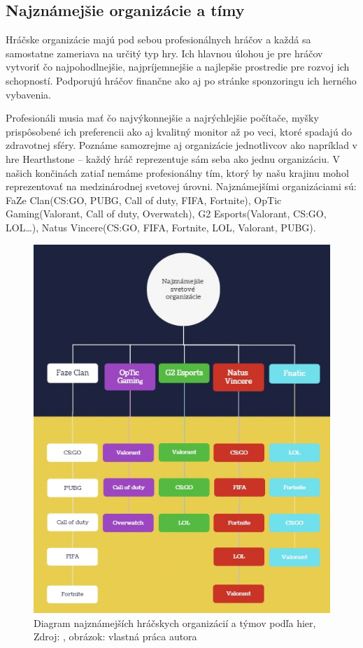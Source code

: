 \documentclass[10pt,oneside,slovak,a4paper]{article}
\begin{document}
\subsection{Najznámejšie organizácie a tímy} \label{klasifikacia:organizacie}

Hráčske organizácie majú pod sebou profesionálnych hráčov a každá sa samostatne zameriava na určitý typ hry. Ich hlavnou úlohou je pre hráčov vytvoriť čo najpohodlnejšie, najpríjemnejšie a najlepšie prostredie pre rozvoj ich schopností. Podporujú hráčov finančne ako aj po stránke sponzoringu ich herného vybavenia. 

Profesionáli musia mať čo najvýkonnejšie a najrýchlejšie počítače, myšky prispôsobené ich preferencii ako aj kvalitný monitor až po veci, ktoré spadajú do zdravotnej sféry. Poznáme samozrejme aj organizácie jednotlivcov ako napríklad v hre Hearthstone – každý hráč reprezentuje sám seba ako jednu organizáciu. V našich končinách zatiaľ nemáme profesionálny tím, ktorý by našu krajinu mohol reprezentovať na medzinárodnej svetovej úrovni.\cite{a4} Najznámejšími organizáciami sú: FaZe Clan(CS:GO, PUBG, Call of duty, FIFA, Fortnite), OpTic Gaming(Valorant, Call of duty, Overwatch), G2 Esports(Valorant, CS:GO, LOL…), Natus Vincere(CS:GO, FIFA, Fortnite, LOL, Valorant, PUBG).\cite{a5}

\begin{figure} [h!]
 \includegraphics[scale=0.86]{Hráčske organizácie a hry.jpg}
 \caption{Diagram najznámejších hráčskych organizácií a týmov podľa hier, \newline
 Zdroj: \cite{a5}, obrázok: vlastná práca autora}
\end{figure}
\end{document}
